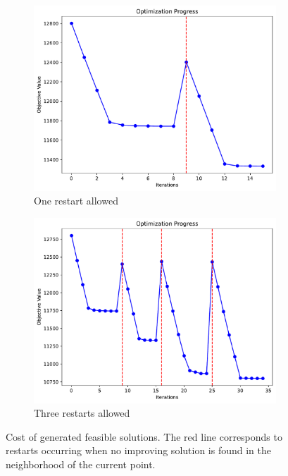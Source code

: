 \documentclass{article}
\begin{document}
\begin{figure}[H]
    \centering
    \begin{subfigure}[t]{0.45\textwidth}  %
        \centering
        \includegraphics[width=\textwidth]{img/1_restart.pdf}
        \caption{One restart allowed}
    \end{subfigure}
    \hspace{1cm} %
    \begin{subfigure}[t]{0.45\textwidth}
        \centering
        \includegraphics[width=\textwidth]{img/3_restarts.pdf}
        \caption{Three restarts allowed}
    \end{subfigure}
    \caption{Cost of generated feasible solutions. The red line corresponds to restarts occurring when no improving solution is found in the neighborhood of the current point.}
    \label{GRASP}
\end{figure}
\end{document}
